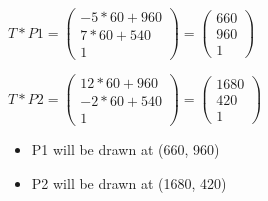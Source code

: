 $
    T * P1
=
    \left(\begin{array}{c}
        -5 * 60 + 960\\
        7 * 60 + 540\\
        1
    \end{array}\right)
=
    \left(\begin{array}{c}
        660\\
        960\\
        1
    \end{array}\right)
$

$
    T * P2
=
    \left(\begin{array}{c}
        12 * 60 + 960\\
        -2 * 60 + 540\\
        1
    \end{array}\right)
=
    \left(\begin{array}{c}
        1680\\
        420\\
        1
    \end{array}\right)
$

\begin{itemize}
    \item P1 will be drawn at (660, 960)
    \item P2 will be drawn at (1680, 420)
\end{itemize}